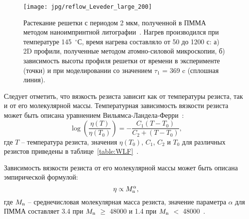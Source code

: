 \begin{figure}
	\begin{center}
		\texttt{[image: jpg/reflow\_Leveder\_large\_200]}
		\caption{Растекание решетки с периодом 2 мкм, полученной в ПММА методом наноимпринтной литографии~\cite{Leveder_2011}. Нагрев производился при температуре 145~$^\circ$С, время нагрева составляло от 50 до 1200 с: а) 2D профили, полученные методом атомно-силовой микроскопии, б) зависимость высоты профиля решетки от времени в эксперименте (точки) и при моделировании со значением $\tau_1$ = 369 c (сплошная линия).}
		\label{fig:ferlow_analytical}
	\end{center}
\end{figure}

Следует отметить, что вязкость резиста зависит как от температуры резиста, так и от его молекулярной массы. Температурная зависимость вязкости резиста может быть описана уравнением Вильямса-Ландела-Ферри~\cite{bird1987dynamics_WLF}:
\begin{equation} \label{eq:WLF}
	\log \left( \frac{\eta(T)}{\eta(T_0)} \right) = -\frac{C_1(T-T_0)}{C_2+(T-T_0)},
\end{equation}
где $T$ -- температура резиста, значения $\eta(T_0)$, $C_1$, $C_2$ и $T_0$ для различных резистов приведены в таблице~\ref{table:WLF}~\cite{aho2008measurement_WLF}.

Зависимость вязкости резиста от его молекулярной массы может быть описана эмпирической формулой:
\begin{equation} \label{eq:3p4_3p1}
	\eta \propto M_\mathrm{n}^\alpha,
\end{equation}
где $M_\mathrm{n}$ -- среднечисловая молекулярная масса резиста, значение параметра $\alpha$ для ПММА составляет 3.4 при $M_\mathrm{n}$ $\geq$ 48000 и 1.4 при $M_\mathrm{n}$ $<$ 48000~\cite{Leveder_2010, Bueche_3p4_1p4}.

